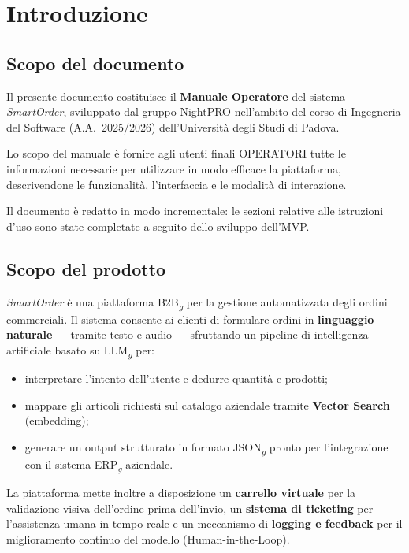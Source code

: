 \section{Introduzione}

\subsection{Scopo del documento}
Il presente documento costituisce il \textbf{Manuale Operatore} del sistema \textit{SmartOrder}, sviluppato dal gruppo NightPRO nell'ambito del corso di Ingegneria del Software (A.A.\ 2025/2026) dell'Universit\`a degli Studi di Padova.

Lo scopo del manuale \`e fornire agli utenti finali OPERATORI tutte le informazioni necessarie per utilizzare in modo efficace la piattaforma, descrivendone le funzionalit\`a, l'interfaccia e le modalit\`a di interazione.

Il documento \`e redatto in modo incrementale: le sezioni relative alle istruzioni d'uso sono state completate a seguito dello sviluppo dell'MVP.

\subsection{Scopo del prodotto}
\textit{SmartOrder} \`e una piattaforma B2B\textsubscript{\textit{g}} per la gestione automatizzata degli ordini commerciali. Il sistema consente ai clienti di formulare ordini in \textbf{linguaggio naturale} --- tramite testo e audio --- sfruttando un pipeline di intelligenza artificiale basato su LLM\textsubscript{\textit{g}} per:

\begin{itemize}[noitemsep]
    \item interpretare l'intento dell'utente e dedurre quantit\`a e prodotti;
    \item mappare gli articoli richiesti sul catalogo aziendale tramite \textbf{Vector Search} (embedding);
    \item generare un output strutturato in formato JSON\textsubscript{\textit{g}} pronto per l'integrazione con il sistema ERP\textsubscript{\textit{g}} aziendale.
\end{itemize}

La piattaforma mette inoltre a disposizione un \textbf{carrello virtuale} per la validazione visiva dell'ordine prima dell'invio, un \textbf{sistema di ticketing} per l'assistenza umana in tempo reale e un meccanismo di \textbf{logging e feedback} per il miglioramento continuo del modello (Human-in-the-Loop).

